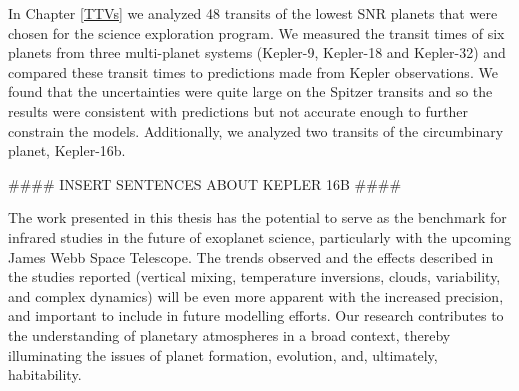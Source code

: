 In Chapter \ref{TTVs} we analyzed 48 transits of the lowest SNR planets that were chosen for the science exploration program. We measured the transit times of six planets from three multi-planet systems (Kepler-9, Kepler-18 and Kepler-32) and compared these transit times to predictions made from Kepler observations. We found that the uncertainties were quite large on the Spitzer transits and so the results were consistent with predictions but not accurate enough to further constrain the models. Additionally, we analyzed two transits of the circumbinary planet, Kepler-16b.

#### INSERT SENTENCES ABOUT KEPLER 16B ####

The work presented in this thesis has the potential to serve as the benchmark for infrared studies in the future of exoplanet science, particularly with the upcoming James Webb Space Telescope. The trends observed and the effects described in the studies reported (vertical mixing, temperature inversions, clouds, variability, and complex dynamics) will be even more apparent with the increased precision, and important to include in future modelling efforts. Our research contributes to the understanding of planetary atmospheres in a broad context, thereby illuminating the issues of planet formation, evolution, and, ultimately, habitability.  

\renewcommand\chapterautorefname{chapter}%


